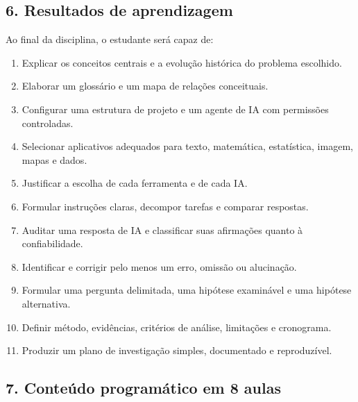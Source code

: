 \documentclass[11pt,a4paper]{article}
\begin{document}
\subsection*{6. Resultados de aprendizagem}

Ao final da disciplina, o estudante será capaz de:

\begin{enumerate}
\item Explicar os conceitos centrais e a evolução histórica do problema escolhido.
\item Elaborar um glossário e um mapa de relações conceituais.
\item Configurar uma estrutura de projeto e um agente de IA com permissões controladas.
\item Selecionar aplicativos adequados para texto, matemática, estatística, imagem, mapas e dados.
\item Justificar a escolha de cada ferramenta e de cada IA.
\item Formular instruções claras, decompor tarefas e comparar respostas.
\item Auditar uma resposta de IA e classificar suas afirmações quanto à confiabilidade.
\item Identificar e corrigir pelo menos um erro, omissão ou alucinação.
\item Formular uma pergunta delimitada, uma hipótese examinável e uma hipótese alternativa.
\item Definir método, evidências, critérios de análise, limitações e cronograma.
\item Produzir um plano de investigação simples, documentado e reproduzível.
\end{enumerate}

\subsection*{7. Conteúdo programático em 8 aulas}
\end{document}
